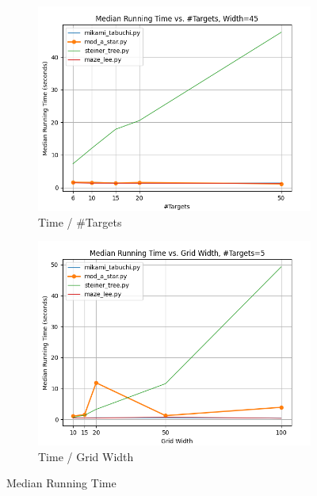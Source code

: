\begin{figure}
\centering

\begin{subfigure}[b]{\linewidth}
    \includegraphics[width=\linewidth]{figures/plots/medianTime_areaConst.png}
    \caption{Time / \#Targets}
\end{subfigure}
\begin{subfigure}[b]{\linewidth}
    \includegraphics[width=\linewidth]{figures/plots/medianTime_nConst.png}
    \caption{Time / Grid Width}
\end{subfigure}

\caption{Median Running Time}
\label{fig:medianRunningTime}
\end{figure}